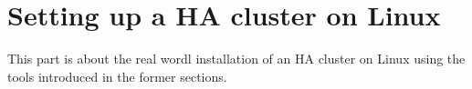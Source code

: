 \section{Setting up a HA cluster on Linux}
This part is about the real wordl installation of an HA cluster on Linux using the tools introduced in the former sections.